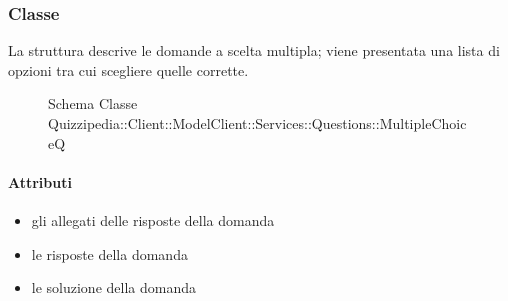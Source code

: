 \subsubsection{Classe }
La struttura descrive le domande a scelta multipla; viene presentata una lista di opzioni tra cui scegliere quelle corrette.
\begin{figure}[H]
\centering
\noindent{}
\caption[Schema Classe MultipleChoiceQ]{Schema Classe Quizzipedia::Client::ModelClient::Services::Questions::MultipleChoiceQ}
\end{figure}
\paragraph{Attributi}
\begin{itemize}
\item {}
\newline
gli allegati delle risposte della domanda
\item {}
\newline
le risposte della domanda
\item {}
\newline
le soluzione della domanda
\end{itemize}
